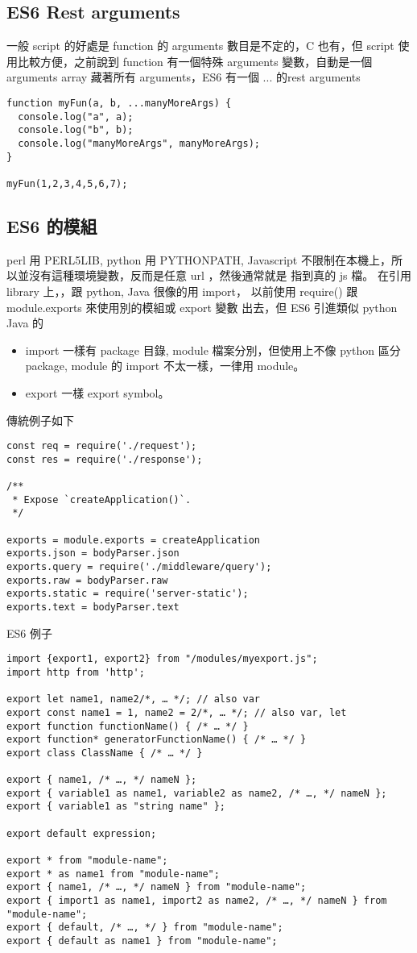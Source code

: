   \subsection{ES6 Rest arguments}
  一般 script 的好處是 function 的 arguments 數目是不定的，C 也有，但 script
  使用比較方便，之前說到 function 有一個特殊 arguments 變數，自動是一個
  arguments array 藏著所有 arguments，ES6 有一個 ... 的rest arguments
  \begin{verbatim}
function myFun(a, b, ...manyMoreArgs) {
  console.log("a", a);
  console.log("b", b);
  console.log("manyMoreArgs", manyMoreArgs);
}

myFun(1,2,3,4,5,6,7);
  \end{verbatim}
  \subsection{ES6 的模組}
  perl 用 PERL5LIB, python 用 PYTHONPATH, Javascript
  不限制在本機上，所以並沒有這種環境變數，反而是任意 url ，然後通常就是
  指到真的 js 檔。 在引用 library 上，，跟 python, Java 很像的用 import，
  以前使用 require() 跟 module.exports 來使用別的模組或 export 變數
  出去，但 ES6 引進類似 python Java 的
  \begin{itemize}
    \item import 一樣有 package 目錄, module 檔案分別，但使用上不像 python
      區分 package, module 的 import 不太一樣，一律用 module。
    \item export 一樣 export symbol。
  \end{itemize}
  傳統例子如下
  \begin{verbatim}
const req = require('./request');
const res = require('./response');

/**
 * Expose `createApplication()`.
 */

exports = module.exports = createApplication
exports.json = bodyParser.json
exports.query = require('./middleware/query');
exports.raw = bodyParser.raw
exports.static = require('server-static');
exports.text = bodyParser.text
  \end{verbatim}
  ES6 例子
  \begin{verbatim}
import {export1, export2} from "/modules/myexport.js";
import http from 'http';
 
export let name1, name2/*, … */; // also var
export const name1 = 1, name2 = 2/*, … */; // also var, let
export function functionName() { /* … */ }
export function* generatorFunctionName() { /* … */ }
export class ClassName { /* … */ }

export { name1, /* …, */ nameN };
export { variable1 as name1, variable2 as name2, /* …, */ nameN };
export { variable1 as "string name" };

export default expression;

export * from "module-name";
export * as name1 from "module-name";
export { name1, /* …, */ nameN } from "module-name";
export { import1 as name1, import2 as name2, /* …, */ nameN } from "module-name";
export { default, /* …, */ } from "module-name";
export { default as name1 } from "module-name";
  \end{verbatim}
